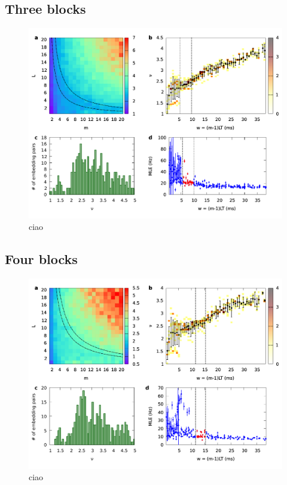 \documentclass[a4paper,11pt,aps,secnumarabic,balancelastpage,amsmath,amssymb,floatfix,table]{article}
\begin{document}
\subsection{Three blocks}

\begin{figure}[H]
    \centering
    \includegraphics[width=\linewidth]{../3_blocks/4e4_points/plots/chaos.pdf}
    \caption{ciao}
    \label{fig:3 blocks chaos}
\end{figure}

\subsection{Four blocks}

\begin{figure}[H]
    \centering
    \includegraphics[width=\linewidth]{../4_blocks/4e4_points/plots/chaos.pdf}
    \caption{ciao}
    \label{fig:4 blocks chaos}
\end{figure}
\end{document}
